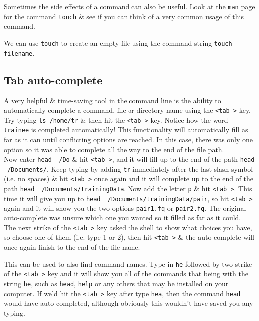\documentclass[a4paper,12pt,twoside]{memoir}
\begin{document}
\begin{bonus}
\begin{questions}
Sometimes the side effects of a command can also be useful. 
Look at the \texttt{man} page for the command \texttt{touch} \& see if you can think of a very common usage of this command. \\
\begin{answer}
We can use \texttt{touch} to create an empty file using the command string \texttt{touch filename}.
\end{answer}
\end{questions}
\end{bonus}

\subsection{Tab auto-complete}
\begin{information}
A very helpful \& time-saving tool in the command line is the ability to automatically complete a command, file or directory name using the \texttt{\textless tab \textgreater} key.
Try typing \texttt{ls /home/tr} \& then hit the \texttt{\textless tab \textgreater} key.
Notice how the word \texttt{trainee} is completed automatically!
This functionality will automatically fill as far as it can until conflicting options are reached.
In this case, there was only one option so it was able to complete all the way to the end of the file path. \\

Now enter \texttt{head ~/Do} \& hit \texttt{\textless tab \textgreater}, and it will fill up to the end of the path \texttt{head ~/Documents/}.
Keep typing by adding \texttt{tr} immediately after the last slash symbol (i.e. no spaces) \& hit \texttt{\textless tab \textgreater} once again and it will complete up to the end of the path \texttt{head ~/Documents/trainingData}.
Now add the letter \texttt{p} \& hit \texttt{\textless tab \textgreater}. 
This time it will give you up to \texttt{head ~/Documents/trainingData/pair}, so hit \texttt{\textless tab \textgreater} again and it will show you the two options \texttt{pair1.fq} or \texttt{pair2.fq}.
The original auto-complete was unsure which one you wanted so it filled as far as it could.
The next strike of the \texttt{\textless tab \textgreater} key asked the shell to show what choices you have, so choose one of them (i.e. type 1 or 2), then hit \texttt{\textless tab \textgreater} \& the auto-complete will once again finish to the end of the file name.

This can be used to also find command names.
Type in \texttt{he} followed by two strike of the \texttt{\textless tab \textgreater} key and it will show you all of the commands that being with the string \texttt{he}, such as \texttt{head}, \texttt{help} or any others that may be installed on your computer.
If we'd hit the \texttt{\textless tab \textgreater} key after type \texttt{hea}, then the command \texttt{head} would have auto-completed, although obviously this wouldn't have saved you any typing.
\end{information}
\end{document}
